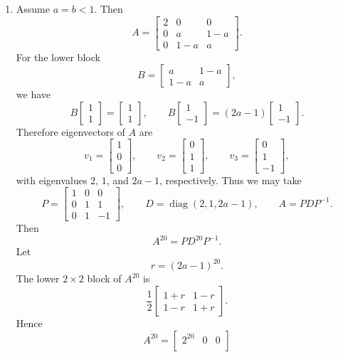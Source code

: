 \documentclass[12pt]{article}
\newcommand{\diag}{\operatorname{diag}}
\begin{document}
\begin{enumerate}[label=(\alph*)]
  \item Assume $a=b<1$. Then
  \[
  A=\begin{bmatrix}
  2&0&0\\
  0&a&1-a\\
  0&1-a&a
  \end{bmatrix}.
  \]
  For the lower block
  \[
  B=\begin{bmatrix}a&1-a\\1-a&a\end{bmatrix},
  \]
  we have
  \[
  B\begin{bmatrix}1\\1\end{bmatrix}=\begin{bmatrix}1\\1\end{bmatrix},
  \qquad
  B\begin{bmatrix}1\\-1\end{bmatrix}=(2a-1)\begin{bmatrix}1\\-1\end{bmatrix}.
  \]
  Therefore eigenvectors of $A$ are
  \[
  v_1=\begin{bmatrix}1\\0\\0\end{bmatrix},
  \qquad
  v_2=\begin{bmatrix}0\\1\\1\end{bmatrix},
  \qquad
  v_3=\begin{bmatrix}0\\1\\-1\end{bmatrix},
  \]
  with eigenvalues $2$, $1$, and $2a-1$, respectively. Thus we may take
  \[
  \boxed{
  P=\begin{bmatrix}1&0&0\\0&1&1\\0&1&-1\end{bmatrix},
  \qquad
  D=\diag(2,1,2a-1),
  \qquad
  A=PDP^{-1}.}
  \]
  Then
  \[
  A^{20}=PD^{20}P^{-1}.
  \]
  Let
  \[
  r=(2a-1)^{20}.
  \]
  The lower $2\times2$ block of $A^{20}$ is
  \[
  \frac12\begin{bmatrix}1+r&1-r\\1-r&1+r\end{bmatrix}.
  \]
  Hence
  \[
  A^{20}=\begin{bmatrix}
  2^{20}&0&0\\

\end{bmatrix}\]
\end{enumerate}
\end{document}
